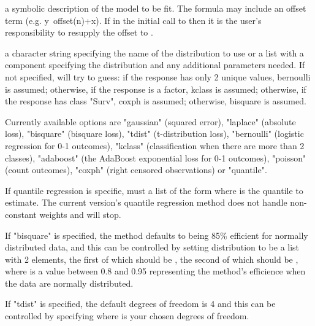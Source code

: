 \documentclass{article}
\begin{document}
\begin{Arguments}
\begin{ldescription}
\item[\code{formula}] a symbolic description of the model to be fit. The formula may 
include an offset term (e.g. y~offset(n)+x). If  in 
the initial call to  then it is the user's responsibility to 
resupply the offset to .
\item[\code{distribution}] a character string specifying the name of the distribution 
to use or a list with a component  specifying the distribution 
and any additional parameters needed. If not specified,  will
try to guess: if the response has only 2 unique values, bernoulli is
assumed; otherwise, if the response is a factor, kclass is assumed; otherwise,
if the response has class "Surv", coxph is assumed; otherwise, bisquare
is assumed.

Currently available options are "gaussian" (squared error), "laplace"
(absolute loss), "bisquare" (bisquare loss), "tdist" (t-distribution loss),
"bernoulli" (logistic regression for 0-1 outcomes), 
"kclass" (classification when there are more than 2 classes),
"adaboost" (the AdaBoost exponential loss for 0-1 outcomes), "poisson" 
(count outcomes), "coxph" (right censored observations) or "quantile".

If quantile regression is specifie,  must a list of the form 
 where  is the quantile 
to estimate. The current version's  quantile regression method does
not handle non-constant weights and will stop.

If "bisquare" is specified, the method defaults to being
85\% efficient for normally distributed data, and this can be controlled
by setting distribution to be a list with 2 elements, the first of which
should be , the second of which should be
, where
 is a value between 0.8 and 0.95 representing the method's
efficience when the data are normally distributed.

If "tdist" is specified,
the default
degrees of freedom is 4 and this can be controlled by specifying
 where  is your chosen degrees of freedom.


\end{ldescription}
\end{Arguments}
\end{document}
